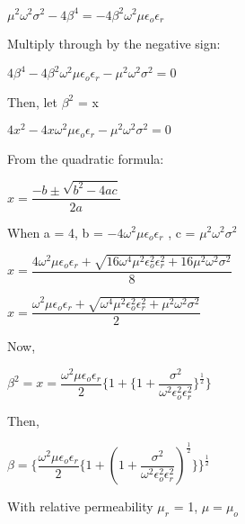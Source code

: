 \begin{center}
$\mu^{2}\omega^{2}\sigma^{2} - 4\beta^{4} = -4\beta^{2}\omega^{2}\mu\epsilon_{o}\epsilon_{r}$
\end{center}

Multiply through by the negative sign:

\begin{center}
$4\beta^{4} -4\beta^{2}\omega^{2}\mu\epsilon_{o}\epsilon_{r} - \mu^{2}\omega^{2}\sigma^{2} = 0$
\end{center}

Then, let $\beta^{2}$ = x
\begin{center}
$4x^{2} -4x\omega^{2}\mu\epsilon_{o}\epsilon_{r} - \mu^{2}\omega^{2}\sigma^{2} = 0$
\end{center}

From the quadratic formula:

\begin{center}
$x = \dfrac{-b\pm \sqrt{b^{2} - 4ac}}{2a}$
\end{center}

When a = 4, b = $-4\omega^{2}\mu\epsilon_{o}\epsilon_{r}$ , c = $\mu^{2}\omega^{2}\sigma^{2}$

\begin{center}
$x = \dfrac{4\omega^{2}\mu\epsilon_{o}\epsilon_{r} + \sqrt{16\omega^{4}\mu^{2}\epsilon_{o}^{2}\epsilon_{r}^{2} + 16\mu^{2}\omega^{2}\sigma^{2}}}{8}$
\end{center}

\begin{center}
$x = \dfrac{\omega^{2}\mu\epsilon_{o}\epsilon_{r} + \sqrt{\omega^{4}\mu^{2}\epsilon_{o}^{2}\epsilon_{r}^{2} + \mu^{2}\omega^{2}\sigma^{2}}}{2}$
\end{center}

Now,
\begin{center}
$\beta^{2} = x = \dfrac{\omega^{2}\mu\epsilon_{o}\epsilon_{r}}{2}\Bigg\{1 + \bigg\{1 + \dfrac{\sigma^{2}}{\omega^{2}\epsilon_{o}^{2}\epsilon_{r}^{2}}\bigg\}^{\frac{1}{2}}\Bigg\}$
\end{center}

Then,

\begin{center}
$\beta =\Bigg\{ \dfrac{\omega^{2}\mu\epsilon_{o}\epsilon_{r}}{2}\bigg\{1 + (1 + \dfrac{\sigma^{2}}{\omega^{2}\epsilon_{o}^{2}\epsilon_{r}^{2}})^{\frac{1}{2}}\bigg\}\Bigg\}^{\frac{1}{2}}$
\end{center}

With relative permeability $\mu_{r}$ = 1, $\mu = \mu_{o}$


